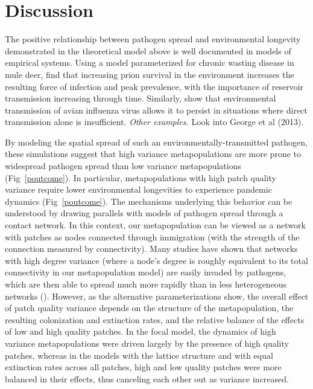 \documentclass{svjour3}
\begin{document}
\section{Discussion}
\label{discussion} 

The positive relationship between pathogen spread and environmental longevity demonstrated in the theoretical model above is well documented in models of empirical systems.  Using a model parameterized for chronic wasting disease in mule deer, \cite{Almberg2011} find that increasing prion survival in the environment increases the resulting force of infection and peak prevalence, with the importance of reservoir transmission increasing through time.  Similarly, \cite{Breban2009} show that environmental transmission of avian influenza virus allows it to persist in situations where direct transmission alone is insufficient.  \emph{Other examples.}  Look into George et al (2013).

By modeling the spatial spread of such an environmentally-transmitted pathogen, these simulations suggest that high variance metapopulations are more prone to widespread pathogen spread than low variance metapopulations (Fig~\ref{poutcome}).  In particular, metapopulations with high patch quality variance require lower environmental longevities to experience pandemic dynamics (Fig~\ref{poutcome}).  The mechanisms underlying this behavior can be understood by drawing parallels with models of pathogen spread through a contact network.  In this context, our metapopulation can be viewed as a network with patches as nodes connected through immigration (with the strength of the connection measured by connectivity).  Many studies have shown that networks with high degree variance (where a node's degree is roughly equivalent to its total connectivity in our metapopulation model) are easily invaded by pathogens, which are then able to spread much more rapidly than in less heterogeneous networks (\cite{Pastor-Satorras2001}).  However, as the alternative parameterizations show, the overall effect of patch quality variance depends on the structure of the metapopulation, the resulting colonization and extinction rates, and the relative balance of the effects of low and high quality patches.  In the focal model, the dynamics of high variance metapopulations were driven largely by the presence of high quality patches, whereas in the models with the lattice structure and with equal extinction rates across all patches, high and low quality patches were more balanced in their effects, thus canceling each other out as variance increased.   
\end{document}
